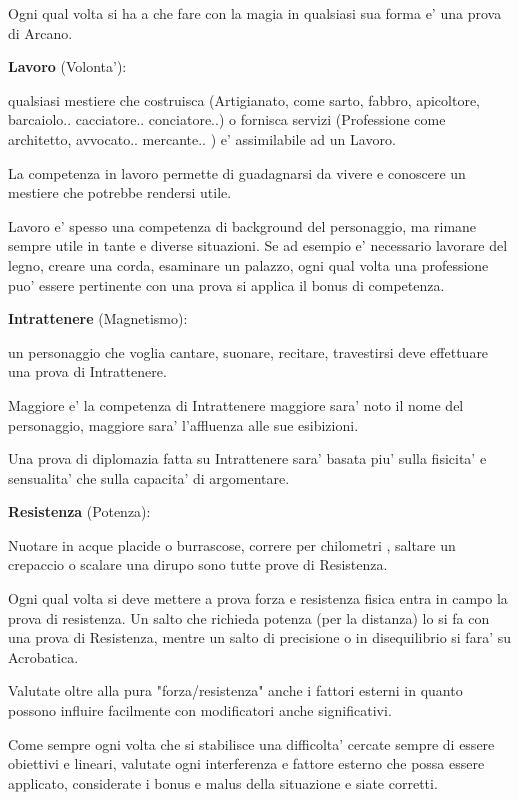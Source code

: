\documentclass[a4paper,11pt,twoside,openany]{book}
\begin{document}
Ogni qual volta si ha a che fare con la magia in qualsiasi sua forma e' una prova di Arcano.

\textbf{Lavoro} (Volonta'):

qualsiasi mestiere che costruisca (Artigianato, come sarto, fabbro, apicoltore, barcaiolo.. cacciatore.. conciatore..) o fornisca servizi (Professione come architetto, avvocato.. mercante.. ) e' assimilabile ad un Lavoro.

La competenza in lavoro permette di guadagnarsi da vivere e conoscere un mestiere che potrebbe rendersi utile.

Lavoro e' spesso una competenza di background del personaggio, ma rimane sempre utile in tante e diverse situazioni. Se ad esempio e' necessario lavorare del legno, creare una corda, esaminare un palazzo, ogni qual volta una professione puo' essere pertinente con una prova si applica il bonus di competenza.

\textbf{Intrattenere} (Magnetismo):

un personaggio che voglia cantare, suonare, recitare, travestirsi deve effettuare una prova di Intrattenere.

Maggiore e' la competenza di Intrattenere maggiore sara' noto il nome del personaggio, maggiore sara' l'affluenza alle sue esibizioni.

Una prova di diplomazia fatta su Intrattenere sara' basata piu' sulla fisicita' e sensualita' che sulla capacita' di argomentare.

\textbf{Resistenza} (Potenza):

Nuotare in acque placide o burrascose, correre per chilometri , saltare un crepaccio o scalare una dirupo sono tutte prove di Resistenza.

Ogni qual volta si deve mettere a prova forza e resistenza fisica entra in campo la prova di resistenza.
Un salto che richieda potenza (per la distanza) lo si fa con una prova di Resistenza, mentre un salto di precisione o in disequilibrio si fara' su Acrobatica.

Valutate oltre alla pura "forza/resistenza" anche i fattori esterni in quanto possono influire facilmente con modificatori anche significativi.

\bigskip

Come sempre ogni volta che si stabilisce una difficolta' cercate sempre di essere obiettivi e lineari, valutate ogni interferenza e fattore esterno che possa essere applicato, considerate i bonus e malus della situazione e siate corretti.
\end{document}
